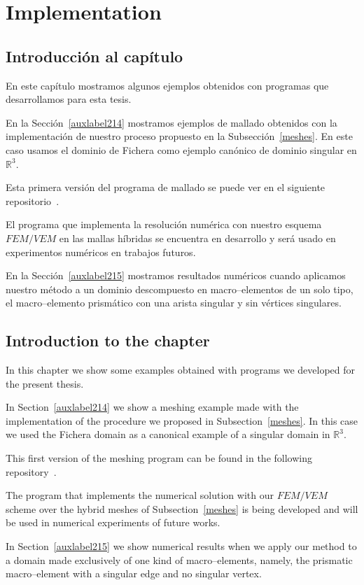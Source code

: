 \chapter{Implementation}

\section*{Introducci\'on al cap\'itulo}
En este cap\'itulo mostramos algunos ejemplos obtenidos 
con programas que desarrollamos para esta tesis.

En la Secci\'on~\ref{auxlabel214} mostramos ejemplos de mallado 
obtenidos con la implementaci\'on de nuestro proceso propuesto 
en la Subsecci\'on~\ref{meshes}. 
En este caso usamos el dominio de Fichera como ejemplo can\'onico 
de dominio singular en $\mathbb{R}^3$.

Esta primera versi\'on del programa de mallado se puede ver en el siguiente 
repositorio~\cite{alexis}.

El programa que implementa la resoluci\'on num\'erica con nuestro esquema
$FEM/VEM$ en las mallas h\'ibridas se encuentra en desarrollo y ser\'a
usado en experimentos num\'ericos en trabajos futuros.

En la Secci\'on~\ref{auxlabel215} mostramos resultados num\'ericos
cuando aplicamos nuestro m\'etodo a un dominio descompuesto en macro--elementos
de un solo tipo, el macro--elemento prism\'atico con una arista singular y sin v\'ertices
singulares.

\section*{Introduction to the chapter}
In this chapter we show some examples obtained with programs we 
developed for the present thesis.

In Section~\ref{auxlabel214} we show a meshing example made with the implementation
of the procedure we proposed in Subsection~\ref{meshes}. In this case we used
the Fichera domain as a canonical example of a singular domain in $\mathbb{R}^3$.

This first version of the meshing program can be found in the following repository~\cite{alexis}.

The program that implements the numerical solution with our $FEM/VEM$ scheme
over the hybrid meshes of Subsection~\ref{meshes} is being developed and will
be used in numerical experiments of future works.

In Section~\ref{auxlabel215} we show numerical results when we
apply our method to a domain made exclusively of one kind of macro--elements,
namely, the prismatic macro--element with a singular edge and no singular vertex.

